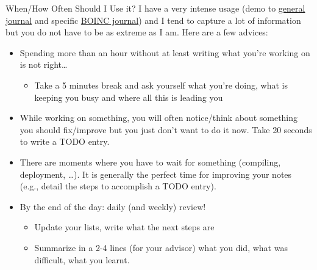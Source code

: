 \documentclass[11pt,xcolor=dvipsnames]{beamer}
\begin{document}
\begin{frame}[label=sec-3-2-3]{When/How Often Should I Use it?}
I have a very intense usage (demo to \alert{\href{file:///Users/jvincent/org/journal.org}{general journal}} and specific
\alert{\href{file:///Users/jvincent/Work/Documents/Articles/2013/2013_boinc_response_time_optimization/journal.org}{BOINC journal}}) and I tend to capture a lot of information but you do
not have to be as extreme as I am. Here are a few advices:

\begin{itemize}
\item Spending \alert{more than an hour without} at least \alert{writing} what you're
working on \alert{is not right}\ldots{}
\begin{itemize}
\item \alert{Take a 5 minutes} break and ask yourself what you're doing, what is
keeping you busy and where all this is leading you
\end{itemize}
\item While working on something, you will often notice/think about
something you should fix/improve but you just don't want to do it
now. Take 20 seconds to write a \alert{TODO} entry.
\item There are moments where you have to \alert{wait for something} (compiling,
deployment, \ldots{}). It is generally the perfect time for improving
your notes (e.g., detail the steps to accomplish a TODO entry).
\item \alert{By the end of the day}: daily (and weekly) \alert{review!}
\begin{itemize}
\item Update your lists, write what the next steps are
\item \alert{Summarize in a 2-4 lines} (for your advisor) what you did, what was
difficult, what you learnt.
\end{itemize}
\end{itemize}
\end{frame}
\end{document}
